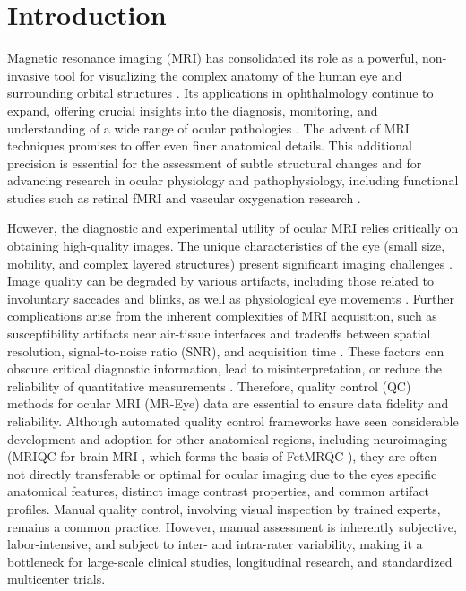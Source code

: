 \chapter{Introduction} %
\label{chap:introduction}


Magnetic resonance imaging (MRI) has consolidated its role as a powerful, non-invasive tool for visualizing the complex anatomy of the human eye and surrounding orbital structures \cite{townsend_clinical_2008, fanea_review_2012}. Its applications in ophthalmology continue to expand, offering crucial insights into the diagnosis, monitoring, and understanding of a wide range of ocular pathologies \cite{duong_magnetic_2014, niendorf_ophthalmic_2021}. The advent of MRI techniques promises to offer even finer anatomical details. This additional precision is essential for the assessment of subtle structural changes and for advancing research in ocular physiology and pathophysiology, including functional studies such as retinal fMRI and vascular oxygenation research \cite{duong_functional_2002, zhang_magnetic_2011}.

However, the diagnostic and experimental utility of ocular MRI relies critically on obtaining high-quality images. The unique characteristics of the eye (small size, mobility, and complex layered structures) present significant imaging challenges \cite{fanea_review_2012, duong_magnetic_2014}. Image quality can be degraded by various artifacts, including those related to involuntary saccades and blinks, as well as physiological eye movements \cite{franceschiello_3-dimensional_2020}. Further complications arise from the inherent complexities of MRI acquisition, such as susceptibility artifacts near air-tissue interfaces and tradeoffs between spatial resolution, signal-to-noise ratio (SNR), and acquisition time \cite{niendorf_ophthalmic_2021}. These factors can obscure critical diagnostic information, lead to misinterpretation, or reduce the reliability of quantitative measurements \cite{schmidt_association_2019}. Therefore, quality control (QC) methods for ocular MRI (MR-Eye) data are essential to ensure data fidelity and reliability.
Although automated quality control frameworks have seen considerable development and adoption for other anatomical regions, including neuroimaging (MRIQC for brain MRI \cite{esteban_mriqc_2017}, which forms the basis of FetMRQC \cite{noauthor_medical-image-analysis-laboratoryfetmrqc_sr_nodate}), they are often not directly transferable or optimal for ocular imaging due to the eyes specific anatomical features, distinct image contrast properties, and common artifact profiles. Manual quality control, involving visual inspection by trained experts, remains a common practice. However, manual assessment is inherently subjective, labor-intensive, and subject to inter- and intra-rater variability, making it a bottleneck for large-scale clinical studies, longitudinal research, and standardized multicenter trials.

